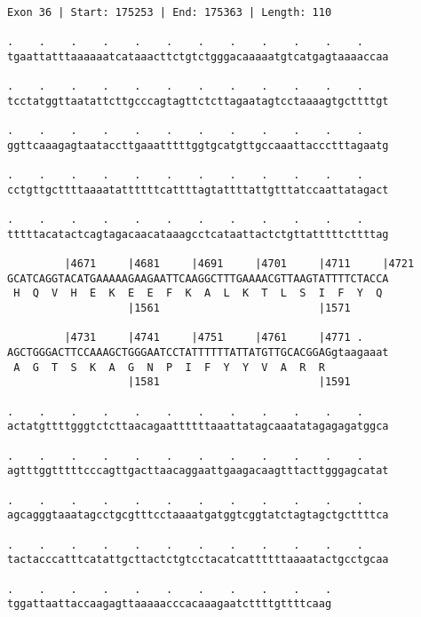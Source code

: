 \documentclass{article}
\begin{document}
\newpage
\begin{Verbatim}
Exon 36 | Start: 175253 | End: 175363 | Length: 110
 
.    .    .    .    .    .    .    .    .    .    .    .    
tgaattatttaaaaaatcataaacttctgtctgggacaaaaatgtcatgagtaaaaccaa
  
.    .    .    .    .    .    .    .    .    .    .    .    
tcctatggttaatattcttgcccagtagttctcttagaatagtcctaaaagtgcttttgt
  
.    .    .    .    .    .    .    .    .    .    .    .    
ggttcaaagagtaataccttgaaatttttggtgcatgttgccaaattaccctttagaatg
  
.    .    .    .    .    .    .    .    .    .    .    .    
cctgttgcttttaaaatattttttcattttagtattttattgtttatccaattatagact
  
.    .    .    .    .    .    .    .    .    .    .    .    
tttttacatactcagtagacaacataaagcctcataattactctgttatttttcttttag
  
         |4671     |4681     |4691     |4701     |4711     |4721
GCATCAGGTACATGAAAAAGAAGAATTCAAGGCTTTGAAAACGTTAAGTATTTTCTACCA
 H  Q  V  H  E  K  E  E  F  K  A  L  K  T  L  S  I  F  Y  Q 
                   |1561                         |1571      
  
         |4731     |4741     |4751     |4761     |4771 .    
AGCTGGGACTTCCAAAGCTGGGAATCCTATTTTTTATTATGTTGCACGGAGgtaagaaat
 A  G  T  S  K  A  G  N  P  I  F  Y  Y  V  A  R  R          
                   |1581                         |1591      
  
.    .    .    .    .    .    .    .    .    .    .    .    
actatgttttgggtctcttaacagaattttttaaattatagcaaatatagagagatggca
  
.    .    .    .    .    .    .    .    .    .    .    .    
agtttggtttttcccagttgacttaacaggaattgaagacaagtttacttgggagcatat
  
.    .    .    .    .    .    .    .    .    .    .    .    
agcagggtaaatagcctgcgtttcctaaaatgatggtcggtatctagtagctgcttttca
  
.    .    .    .    .    .    .    .    .    .    .    .    
tactacccatttcatattgcttactctgtcctacatcattttttaaaatactgcctgcaa
  
.    .    .    .    .    .    .    .    .    .    .
tggattaattaccaagagttaaaaacccacaaagaatcttttgttttcaag
\end{Verbatim}
\newpage
\end{document}
